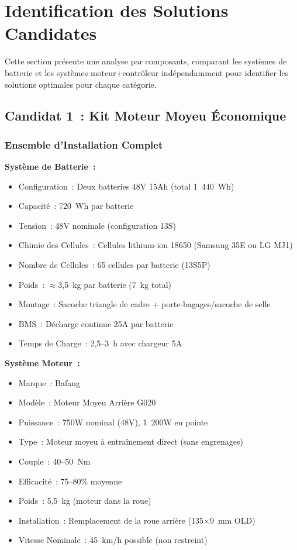 \documentclass[12pt,a4paper]{article}
\begin{document}
\section{Identification des Solutions Candidates}

Cette section présente une analyse par composants, comparant les systèmes de batterie et les systèmes moteur+contrôleur indépendamment pour identifier les solutions optimales pour chaque catégorie.

\subsection{Candidat 1~: Kit Moteur Moyeu Économique}

\subsubsection{Ensemble d'Installation Complet}

\textbf{Système de Batterie~:}
\begin{itemize}
    \item Configuration~: Deux batteries 48V 15Ah (total 1~440~Wh)
    \item Capacité~: 720~Wh par batterie
    \item Tension~: 48V nominale (configuration 13S)
    \item Chimie des Cellules~: Cellules lithium-ion 18650 (Samsung 35E ou LG MJ1) \cite{samsung-35e, lg-mj1}
    \item Nombre de Cellules~: 65 cellules par batterie (13S5P)
    \item Poids~: $\approx$3,5~kg par batterie (7~kg total)
    \item Montage~: Sacoche triangle de cadre + porte-bagages/sacoche de selle
    \item BMS~: Décharge continue 25A par batterie
    \item Temps de Charge~: 2,5--3~h avec chargeur 5A
\end{itemize}

\textbf{Système Moteur~:}
\begin{itemize}
    \item Marque~: Bafang
    \item Modèle~: Moteur Moyeu Arrière G020 \cite{bafang-g020}
    \item Puissance~: 750W nominal (48V), 1~200W en pointe
    \item Type~: Moteur moyeu à entraînement direct (sans engrenages)
    \item Couple~: 40--50~Nm
    \item Efficacité~: 75--80\% moyenne
    \item Poids~: 5,5~kg (moteur dans la roue)
    \item Installation~: Remplacement de la roue arrière (135×9~mm OLD)
    \item Vitesse Nominale~: 45~km/h possible (non restreint)
\end{itemize}
\end{document}
